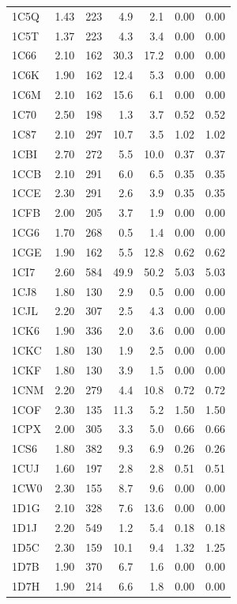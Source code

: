 \begin{longtable}{lrrrrrr}
1C5Q & 1.43 & 223 & 4.9 & 2.1 & 0.00 & 0.00 \\
1C5T & 1.37 & 223 & 4.3 & 3.4 & 0.00 & 0.00 \\
1C66 & 2.10 & 162 & 30.3 & 17.2 & 0.00 & 0.00 \\
1C6K & 1.90 & 162 & 12.4 & 5.3 & 0.00 & 0.00 \\
1C6M & 2.10 & 162 & 15.6 & 6.1 & 0.00 & 0.00 \\
1C70 & 2.50 & 198 & 1.3 & 3.7 & 0.52 & 0.52 \\
1C87 & 2.10 & 297 & 10.7 & 3.5 & 1.02 & 1.02 \\
1CBI & 2.70 & 272 & 5.5 & 10.0 & 0.37 & 0.37 \\
1CCB & 2.10 & 291 & 6.0 & 6.5 & 0.35 & 0.35 \\
1CCE & 2.30 & 291 & 2.6 & 3.9 & 0.35 & 0.35 \\
1CFB & 2.00 & 205 & 3.7 & 1.9 & 0.00 & 0.00 \\
1CG6 & 1.70 & 268 & 0.5 & 1.4 & 0.00 & 0.00 \\
1CGE & 1.90 & 162 & 5.5 & 12.8 & 0.62 & 0.62 \\
1CI7 & 2.60 & 584 & 49.9 & 50.2 & 5.03 & 5.03 \\
1CJ8 & 1.80 & 130 & 2.9 & 0.5 & 0.00 & 0.00 \\
1CJL & 2.20 & 307 & 2.5 & 4.3 & 0.00 & 0.00 \\
1CK6 & 1.90 & 336 & 2.0 & 3.6 & 0.00 & 0.00 \\
1CKC & 1.80 & 130 & 1.9 & 2.5 & 0.00 & 0.00 \\
1CKF & 1.80 & 130 & 3.9 & 1.5 & 0.00 & 0.00 \\
1CNM & 2.20 & 279 & 4.4 & 10.8 & 0.72 & 0.72 \\
1COF & 2.30 & 135 & 11.3 & 5.2 & 1.50 & 1.50 \\
1CPX & 2.00 & 305 & 3.3 & 5.0 & 0.66 & 0.66 \\
1CS6 & 1.80 & 382 & 9.3 & 6.9 & 0.26 & 0.26 \\
1CUJ & 1.60 & 197 & 2.8 & 2.8 & 0.51 & 0.51 \\
1CW0 & 2.30 & 155 & 8.7 & 9.6 & 0.00 & 0.00 \\
1D1G & 2.10 & 328 & 7.6 & 13.6 & 0.00 & 0.00 \\
1D1J & 2.20 & 549 & 1.2 & 5.4 & 0.18 & 0.18 \\
1D5C & 2.30 & 159 & 10.1 & 9.4 & 1.32 & 1.25 \\
1D7B & 1.90 & 370 & 6.7 & 1.6 & 0.00 & 0.00 \\
1D7H & 1.90 & 214 & 6.6 & 1.8 & 0.00 & 0.00 \\

\end{longtable}
